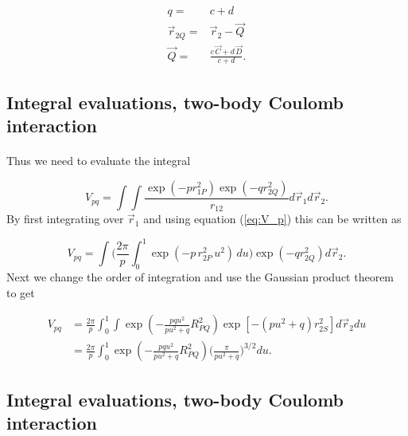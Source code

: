 \documentclass[%
twoside,                 %
final,                   %
10pt]{article}
\begin{document}
\begin{equation}
 \begin{split}
    q = & c + d\\
  \vec r_{2Q} = & \vec r_2 - \vec Q \\
  \vec Q = & \frac{c\,\vec C + d\,\vec D}{c + d}.
 \end{split}
\end{equation}



\subsection*{Integral evaluations, two-body Coulomb interaction}

\paragraph{}

Thus we need to evaluate the integral

\begin{equation}
 V_{pq} = \int\int\frac{\exp(-pr^2_{1P})\exp(-qr^2_{2Q})}{r_{12}}d \vec r_1 d\vec r_2.
\end{equation}
By first integrating over $\vec r_1$ and using equation (\ref{eq:V_p}) this can be written as

\begin{equation}
 V_{pq} = \int\Big(\frac{2\pi}{p}\int_0^1\exp(-p\,r^2_{2P}\,u^2)\,du\Big)\exp(-qr^2_{2Q}) d \vec r_2.
\end{equation}
Next we change the order of integration and use the Gaussian product theorem to get

\begin{equation}
\begin{split}
 V_{pq} & = \frac{2\pi}{p}\int_0^1\int\exp(-\frac{pqu^2}{pu^2+q}R^2_{PQ})\exp[-(pu^2+q)r_{2S}^2] d\vec r_2 du \\
        & = \frac{2\pi}{p}\int_0^1\exp(-\frac{pqu^2}{pu^2+q}R^2_{PQ})\Big(\frac{\pi}{pu^2+q}\Big)^{3/2} du.
\end{split}
\end{equation}



\subsection*{Integral evaluations, two-body Coulomb interaction}
\end{document}
